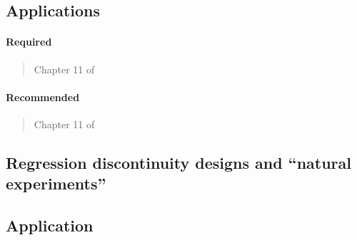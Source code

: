 \documentclass[12pt]{article}
\begin{document}
\subsection*{Applications}

\begin{verse}  \end{verse}

\begin{verse}  \end{verse}

\paragraph*{Required}

\begin{verse} Chapter 11 of  \end{verse}

\paragraph*{Recommended}

\begin{verse}  \end{verse}

\begin{verse} Chapter 11 of  \end{verse}

\begin{verse}  \end{verse}

\begin{verse}  \end{verse}

\begin{verse}  \end{verse}

\begin{verse}  \end{verse}

\subsection{Regression discontinuity designs and ``natural experiments''}

\subsection*{Application}
\end{document}

